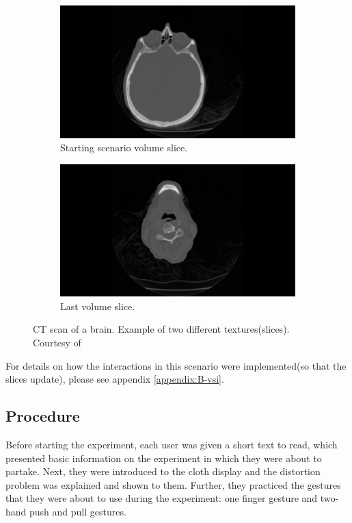 \documentclass[]{article}
\begin{document}
\begin{figure}[!hbtp]
\centering
\begin{subfigure}{.5\textwidth}
  \centering
  \includegraphics[width=0.9\linewidth]{figures/brain_043.jpg}
  \caption{Starting scenario volume slice.}
  \label{fig:StartBrainSlice}
\end{subfigure}%
\begin{subfigure}{.5\textwidth}
  \centering
  \includegraphics[width=0.9\linewidth]{figures/brain_098.jpg}
  \caption{Last volume slice.}
  \label{fig:EndBrainSlice}
\end{subfigure}
\caption{CT scan of a brain. Example of two different textures(slices). Courtesy of \cite{levoy2001}}
\label{fig:BrainSlices}
\end{figure}

For details on how the interactions in this scenario were implemented(so that the slices update), please see appendix \ref{appendix:B-vsi}.

\subsection{Procedure}

Before starting the experiment, each user was given a short text to read, which presented basic information on the experiment in which they were about to partake. Next, they were introduced to the cloth display and the distortion problem was explained and shown to them. Further, they practiced the gestures that they were about to use during the experiment: one finger gesture and two-hand push and pull gestures. 
\end{document}
